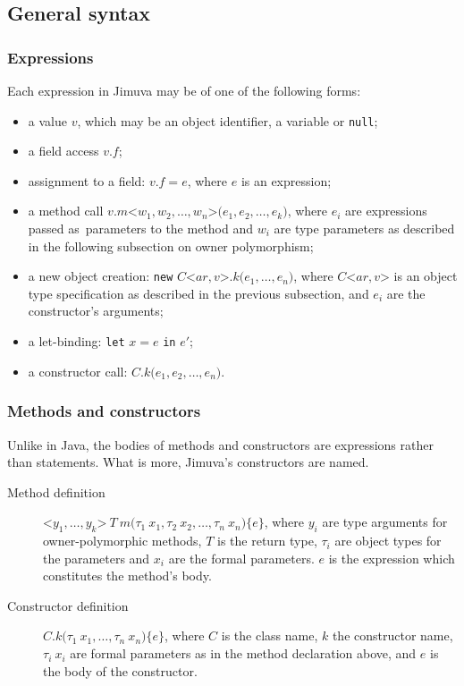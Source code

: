 \documentclass{pracamgr}
\theoremstyle{break}
\theoremstyle{break}
\theoremstyle{break}
\begin{document}
\subsection{General syntax}

\subsubsection{Expressions}

Each expression in Jimuva may be of one of the following forms: 
\begin{itemize}
  \item a value $v$, which may be an object identifier, a variable or
    \texttt{null}; 
  \item a field access $v.f$; 
  \item assignment to a field: $v.f = e$, where $e$ is an expression; 
  \item a method call $v.m\texttt{<}w_1, w_2, \dots,
    w_n\texttt{>(}e_1, e_2, \dots, e_k\texttt{)}$, where $e_i$ are
    expressions passed as~parameters to the method and $w_i$ are type
    parameters as described in the following subsection on owner
    polymorphism;
  \item a new object creation: \texttt{new} $C\texttt{<}ar,
    v\texttt{>}.k\texttt{(}e_1, \dots, e_n\texttt{)}$, where
    $C\texttt{<}ar, v\texttt{>}$ is an object type specification as
    described in the previous subsection, and $e_i$ are the
    constructor's arguments;
  \item a let-binding: \texttt{let} $x = e$ \texttt{in} $e'$; 
  \item a constructor call: $C.k\texttt{(}e_1, e_2, \dots,
    e_n\texttt{)}$.
\end{itemize}

\subsubsection{Methods and constructors}

Unlike in Java, the bodies of methods and constructors are expressions
rather than statements. What is more, Jimuva's constructors are named.

\begin{description}
\item[Method definition] $\texttt{<}y_1, \dots, y_k\texttt{>}\  T\
  m\texttt{(}\tau_1\ x_1, \tau_2\ x_2, \dots, \tau_n\ x_n\texttt{)}
  \lbrace e \rbrace$, where $y_i$ are type arguments for
  owner-polymorphic methods, $T$ is the return type, $\tau_i$ are
  object types for the parameters and $x_i$ are the formal
  parameters. $e$ is the expression which constitutes the method's
  body.
\item[Constructor definition] $C.k\texttt{(}\tau_1\ x_1, \dots,
  \tau_n\ x_n\texttt{)} \lbrace e \rbrace$, where $C$ is the class
  name, $k$ the constructor name, $\tau_i\ x_i$ are formal parameters
  as in the method declaration above, and $e$ is the body of the
  constructor.
\end{description}
\end{document}
